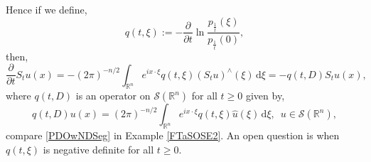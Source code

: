 \documentclass[a4paper, 12pt]{report}
\theoremstyle{remark}
\theoremstyle{definition}
\begin{document}
Hence if we define,
\begin{equation}
q(t, \xi) := -\frac{\partial}{\partial t}\ln\frac{p_\frac{1}{t}(\xi)}{p_\frac{1}{t}(0)},
\end{equation}
then,
$$
\frac{\partial}{\partial t}S_tu(x) = -(2\pi)^{-n/2}\int_{\mathbb{R}^n}e^{ix\cdot\xi}q(t, \xi)(S_tu)^\wedge(\xi)\,\mathrm{d}\xi = -q(t, D)S_tu(x),
$$
where $q(t, D)$ is an operator on $\mathcal{S}(\mathbb{R}^n)$ for all $t \ge 0$ given by,
\begin{equation}
q(t, D)u(x) = (2\pi)^{-n/2}\int_{\mathbb{R}^n}e^{ix\cdot\xi}q(t, \xi)\hat{u}(\xi)\,\mathrm{d}\xi, \,\,\, u \in \mathcal{S}(\mathbb{R}^n),
\end{equation}
compare \eqref{PDOwNDSeg} in Example \ref{FTaSOSE2}.  An open question is when $q(t, \xi)$ is negative definite for all $t \ge 0$.
\end{document}
